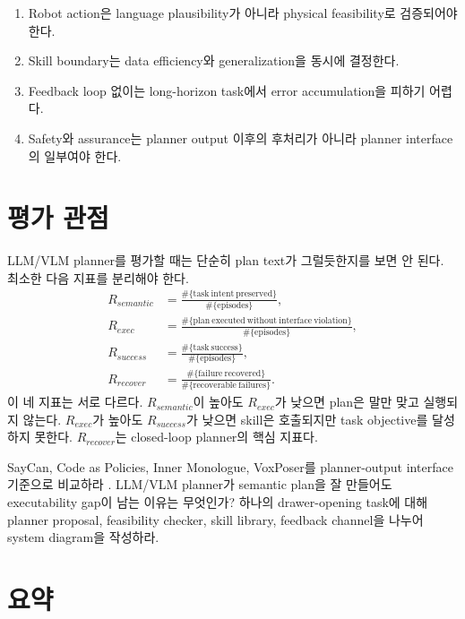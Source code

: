 \begin{enumerate}
  \item Robot action은 language plausibility가 아니라 physical feasibility로 검증되어야 한다.
  \item Skill boundary는 data efficiency와 generalization을 동시에 결정한다.
  \item Feedback loop 없이는 long-horizon task에서 error accumulation을 피하기 어렵다.
  \item Safety와 assurance는 planner output 이후의 후처리가 아니라 planner interface의 일부여야 한다.
\end{enumerate}

\section{평가 관점}

LLM/VLM planner를 평가할 때는 단순히 plan text가 그럴듯한지를 보면 안 된다. 최소한 다음 지표를 분리해야 한다.
\begin{align}
  R_{semantic} &= \frac{\#\{\mathrm{task\ intent\ preserved}\}}{\#\{\mathrm{episodes}\}}, \\
  R_{exec} &= \frac{\#\{\mathrm{plan\ executed\ without\ interface\ violation}\}}{\#\{\mathrm{episodes}\}}, \\
  R_{success} &= \frac{\#\{\mathrm{task\ success}\}}{\#\{\mathrm{episodes}\}}, \\
  R_{recover} &= \frac{\#\{\mathrm{failure\ recovered}\}}{\#\{\mathrm{recoverable\ failures}\}}.
  \label{eq:planner-eval}
\end{align}
이 네 지표는 서로 다르다. $R_{semantic}$이 높아도 $R_{exec}$가 낮으면 plan은 말만 맞고 실행되지 않는다. $R_{exec}$가 높아도 $R_{success}$가 낮으면 skill은 호출되지만 task objective를 달성하지 못한다. $R_{recover}$는 closed-loop planner의 핵심 지표다.

\chapterwork
{SayCan, Code as Policies, Inner Monologue, VoxPoser를 planner-output interface 기준으로 비교하라 \cite{saycan2022,codeaspolicies2022,innermonologue2022,voxposer2023}.}
{LLM/VLM planner가 semantic plan을 잘 만들어도 executability gap이 남는 이유는 무엇인가?}
{하나의 drawer-opening task에 대해 planner proposal, feasibility checker, skill library, feedback channel을 나누어 system diagram을 작성하라.}

\section{요약}

